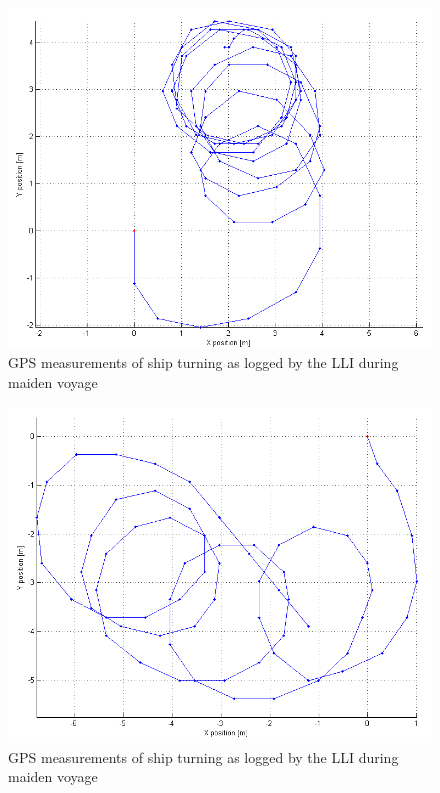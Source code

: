 \begin{figure}[htpb]
	\begin{center}
		\includegraphics[width=\textwidth]{img/maidenVoyage/ship_turning2}
		\caption{GPS measurements of ship turning as logged by the LLI during maiden voyage} 
		\label{fig:ship_turning2}
	\end{center}
\end{figure}

\begin{figure}[htpb]
	\begin{center}
		\includegraphics[width=\textwidth]{img/maidenVoyage/ship_turning}
		\caption{GPS measurements of ship turning as logged by the LLI during maiden voyage} 
		\label{fig:ship_turning}
	\end{center}   
\end{figure}

